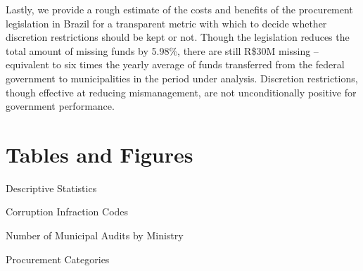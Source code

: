 \documentclass[11pt]{article}
\begin{document}
Lastly, we provide a rough estimate of the costs and benefits of the procurement legislation in Brazil for a transparent metric with which to decide whether discretion restrictions should be kept or not. Though the legislation reduces the total amount of missing funds by 5.98\%, there are still R\$30M missing -- equivalent to six times the yearly average of funds transferred from the federal government to municipalities in the period under analysis. Discretion restrictions, though effective at reducing mismanagement, are not unconditionally positive for government performance.

\pagebreak

\setlength\bibsep{0pt}



\pagebreak

\section*{Tables and Figures} \label{sec:tables}

\begin{table}[!ht]
\centering
\caption[table1]{Descriptive Statistics}\label{tab:descriptivestatistics}
\vspace{-10pt}

\end{table}

\begin{table}[ht]
\centering
\caption[table2]{Corruption Infraction Codes}\label{tab:corruptioncodes}
\vspace{-10pt}

\end{table}

\begin{table}[ht]
\centering
\caption[table3]{Number of Municipal Audits by Ministry}\label{tab:auditbyministry}
\vspace{-10pt}

\end{table}

\begin{table}[ht]
\centering
\caption[table4]{Procurement Categories}\label{tab:procurementtypes}
\vspace{-10pt}

\end{table}
\end{document}
